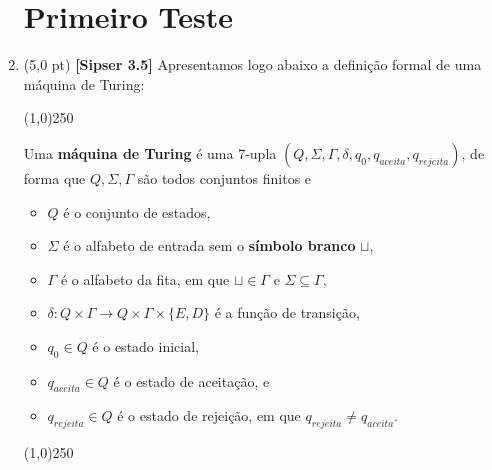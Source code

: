\documentclass[12pt,a4paper,oneside]{article}
\begin{document}
\begin{enumerate}
	
	\section{Primeiro Teste}
	
	\item (5,0 pt)	{\bf [Sipser 3.5]} Apresentamos logo abaixo a definição formal de uma máquina de Turing:
	
	\begin{center}
		\line(1,0){250}
	\end{center}	
	
	Uma {\bf máquina de Turing} é uma 7-upla $(Q, \Sigma, \Gamma, \delta, q_0, q_{aceita}, q_{rejeita})$, de forma que $Q, \Sigma, \Gamma$ são todos conjuntos finitos e
	
	\begin{itemize}
		\item $Q$ é o conjunto de estados,
		\item $\Sigma$ é o alfabeto de entrada sem o {\bf símbolo branco} $\sqcup$,
		\item $\Gamma$ é o alfabeto da fita, em que $\sqcup \in \Gamma$ e $\Sigma \subseteq \Gamma$,
		\item $\delta : Q \times \Gamma \rightarrow Q \times \Gamma \times \{E, D\}$ é a função de transição,
		\item $q_0 \in Q$ é o estado inicial,
		\item $q_{aceita} \in Q$ é o estado de aceitação, e
		\item $q_{rejeita} \in Q$ é o estado de rejeição, em que $q_{rejeita} \not= q_{aceita}$.
	\end{itemize}
	
	\begin{center}
		\line(1,0){250}
	\end{center}		
	

\end{enumerate}
\end{document}
